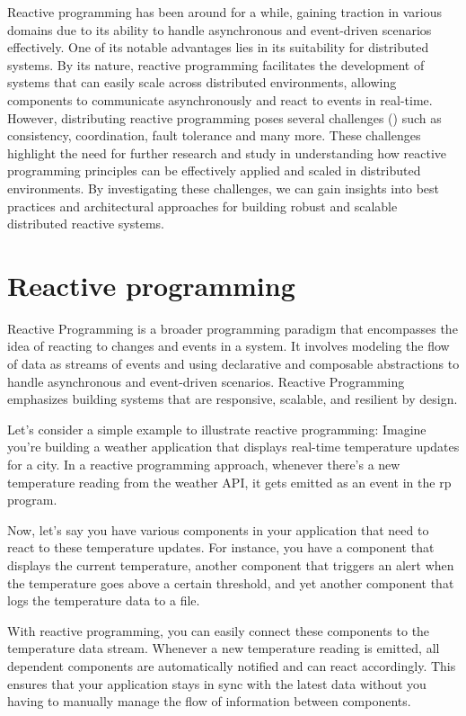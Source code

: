 \documentclass[a4paper]{book}
\begin{document}
Reactive programming has been around for a while, gaining traction in various domains due to its ability to handle asynchronous and event-driven scenarios effectively. One of its notable advantages lies in its suitability for distributed systems. By its nature, reactive programming facilitates the development of systems that can easily scale across distributed environments, allowing components to communicate asynchronously and react to events in real-time. However, distributing reactive programming poses several challenges (\cite{DBLP:journals/csur/BainomugishaCCMM13}) such as consistency, coordination, fault tolerance and many more. These challenges highlight the need for further research and study in understanding how reactive programming principles can be effectively applied and scaled in distributed environments. By investigating these challenges, we can gain insights into best practices and architectural approaches for building robust and scalable distributed reactive systems.

\section{Reactive programming}
Reactive Programming is a broader programming paradigm that encompasses the idea of reacting to changes and events in a system. It involves modeling the flow of data as streams of events and using declarative and composable abstractions to handle asynchronous and event-driven scenarios. Reactive Programming emphasizes building systems that are responsive, scalable, and resilient by design.

Let's consider a simple example to illustrate reactive programming: Imagine you're building a weather application that displays real-time temperature updates for a city. In a reactive programming approach, whenever there's a new temperature reading from the weather API, it gets emitted as an event in the rp program.

Now, let's say you have various components in your application that need to react to these temperature updates. For instance, you have a component that displays the current temperature, another component that triggers an alert when the temperature goes above a certain threshold, and yet another component that logs the temperature data to a file.

With reactive programming, you can easily connect these components to the temperature data stream. Whenever a new temperature reading is emitted, all dependent components are automatically notified and can react accordingly. This ensures that your application stays in sync with the latest data without you having to manually manage the flow of information between components.
\end{document}
